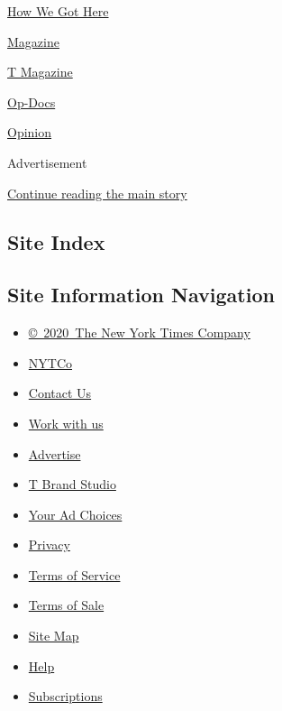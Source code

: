 \href{/video/how-we-got-here}{How We Got Here}

\href{/video/magazine}{Magazine}

\href{/video/t-magazine}{T Magazine}

\href{/video/op-docs}{Op-Docs}

\href{/video/opinion}{Opinion}

Advertisement

\protect\hyperlink{after-bottom}{Continue reading the main story}

\hypertarget{site-index}{%
\subsection{Site Index}\label{site-index}}

\hypertarget{site-information-navigation}{%
\subsection{Site Information
Navigation}\label{site-information-navigation}}

\begin{itemize}
\tightlist
\item
  \href{https://help.nytimes.com/hc/en-us/articles/115014792127-Copyright-notice}{©~2020~The
  New York Times Company}
\end{itemize}

\begin{itemize}
\tightlist
\item
  \href{https://www.nytco.com/}{NYTCo}
\item
  \href{https://help.nytimes.com/hc/en-us/articles/115015385887-Contact-Us}{Contact
  Us}
\item
  \href{https://www.nytco.com/careers/}{Work with us}
\item
  \href{https://nytmediakit.com/}{Advertise}
\item
  \href{http://www.tbrandstudio.com/}{T Brand Studio}
\item
  \href{https://www.nytimes.com/privacy/cookie-policy\#how-do-i-manage-trackers}{Your
  Ad Choices}
\item
  \href{https://www.nytimes.com/privacy}{Privacy}
\item
  \href{https://help.nytimes.com/hc/en-us/articles/115014893428-Terms-of-service}{Terms
  of Service}
\item
  \href{https://help.nytimes.com/hc/en-us/articles/115014893968-Terms-of-sale}{Terms
  of Sale}
\item
  \href{https://spiderbites.nytimes.com}{Site Map}
\item
  \href{https://help.nytimes.com/hc/en-us}{Help}
\item
  \href{https://www.nytimes.com/subscription?campaignId=37WXW}{Subscriptions}
\end{itemize}
